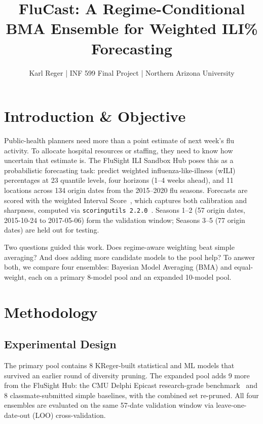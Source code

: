\documentclass[11pt]{article}
\title{\vspace{-1.5em}\textbf{\color{accent}FluCast: A Regime-Conditional BMA Ensemble for Weighted ILI\% Forecasting}}
\author{\normalsize Karl Reger \quad | \quad INF 599 Final Project \quad | \quad Northern Arizona University}
\date{\vspace{-1em}}
\begin{document}
\maketitle
\vspace{-2em}

\section{Introduction \& Objective}

Public-health planners need more than a point estimate of next week's
flu activity. To allocate hospital resources or staffing, they need
to know how uncertain that estimate is. The FluSight ILI Sandbox Hub
poses this as a probabilistic forecasting task: predict weighted
influenza-like-illness (wILI) percentages at 23 quantile levels, four
horizons (1--4 weeks ahead), and 11 locations across 134 origin dates
from the 2015--2020 flu seasons. Forecasts are scored with the
weighted Interval Score~\cite{bracher2021wis}, which captures both
calibration and sharpness, computed via
\texttt{scoringutils 2.2.0}~\cite{bosse2022scoringutils}. Seasons
1--2 (57 origin dates, 2015-10-24 to 2017-05-06) form the validation
window; Seasons 3--5 (77 origin dates) are held out for testing.

Two questions guided this work. Does regime-aware weighting beat
simple averaging? And does adding more candidate models to the pool
help? To answer both, we compare four ensembles: Bayesian Model
Averaging (BMA) and equal-weight, each on a primary 8-model pool and
an expanded 10-model pool.

\section{Methodology}

\subsection{Experimental Design}

The primary pool contains 8 KReger-built statistical and ML models
that survived an earlier round of diversity pruning. The expanded
pool adds 9 more from the FluSight Hub: the CMU Delphi Epicast
research-grade benchmark~\cite{delphi2017epicast} and 8
classmate-submitted simple baselines, with the combined set
re-pruned. All four ensembles are evaluated on the same 57-date
validation window via leave-one-date-out (LOO) cross-validation.
\end{document}
